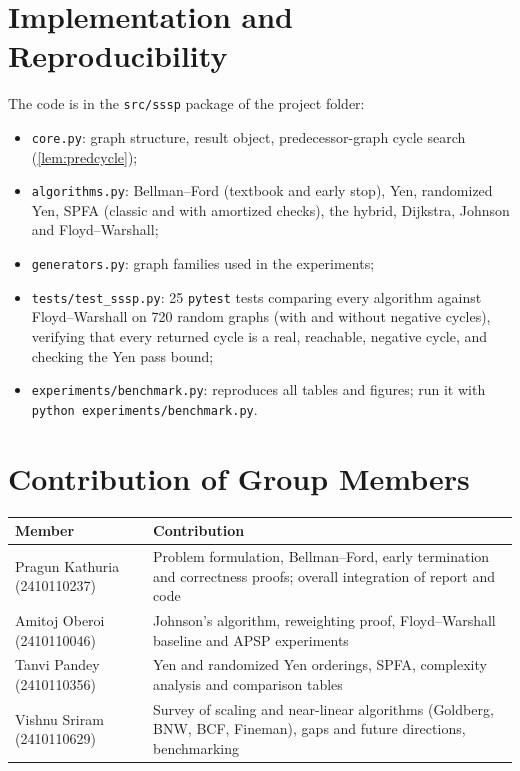 \documentclass[11pt,a4paper]{article}
\theoremstyle{definition}
\begin{document}
\appendix
\section{Implementation and Reproducibility}

The code is in the \texttt{src/sssp} package of the project folder:
\begin{itemize}
\item \texttt{core.py}: graph structure, result object, predecessor-graph cycle search (\cref{lem:predcycle});
\item \texttt{algorithms.py}: Bellman--Ford (textbook and early stop), Yen, randomized Yen, SPFA (classic and with amortized checks), the hybrid, Dijkstra, Johnson and Floyd--Warshall;
\item \texttt{generators.py}: graph families used in the experiments;
\item \texttt{tests/test\_sssp.py}: 25 \texttt{pytest} tests comparing every algorithm against Floyd--Warshall on 720 random graphs (with and without negative cycles), verifying that every returned cycle is a real, reachable, negative cycle, and checking the Yen pass bound;
\item \texttt{experiments/benchmark.py}: reproduces all tables and figures; run it with \texttt{python experiments/benchmark.py}.
\end{itemize}

\section{Contribution of Group Members}
\begin{center}
\begin{tabular}{@{}lp{10.5cm}@{}}
\toprule
\textbf{Member} & \textbf{Contribution}\\
\midrule
Pragun Kathuria (2410110237) & Problem formulation, Bellman--Ford, early termination and correctness proofs; overall integration of report and code\\
Amitoj Oberoi (2410110046) & Johnson's algorithm, reweighting proof, Floyd--Warshall baseline and APSP experiments\\
Tanvi Pandey (2410110356) & Yen and randomized Yen orderings, SPFA, complexity analysis and comparison tables\\
Vishnu Sriram (2410110629) & Survey of scaling and near-linear algorithms (Goldberg, BNW, BCF, Fineman), gaps and future directions, benchmarking\\
\bottomrule
\end{tabular}
\end{center}
\end{document}
